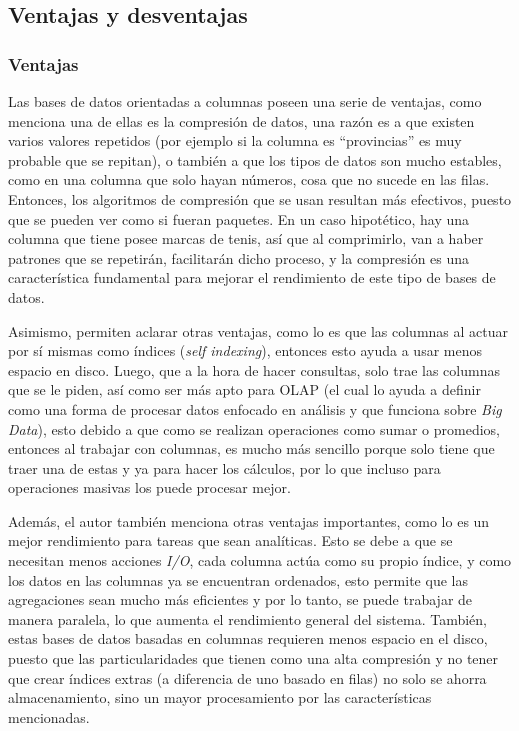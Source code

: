 \subsection{Ventajas y desventajas}
 \subsubsection{Ventajas}
 Las bases de datos orientadas a columnas poseen una serie de ventajas, como menciona \textcite{abadi2013} una de ellas es la compresión de datos, una razón es a que existen varios valores repetidos (por ejemplo si la columna es “provincias” es muy probable que se repitan), o también a que los tipos de datos son mucho estables, como en una columna que solo hayan números, cosa que no sucede en las filas. Entonces, los algoritmos de compresión que se usan resultan más efectivos, puesto que se pueden ver como si fueran paquetes. En un caso hipotético, hay una columna que tiene posee marcas de tenis, así que al comprimirlo, van a haber patrones que se repetirán, facilitarán dicho proceso, y la compresión es una característica fundamental para mejorar el rendimiento de este tipo de bases de datos.

 Asimismo, \textcite{saeed2020} permiten aclarar otras ventajas, como lo es que las columnas al actuar por sí mismas como índices (\textit{self indexing}), entonces esto ayuda a usar menos espacio en disco. Luego, que a la hora de hacer consultas, solo trae las columnas que se le piden, así como ser más apto para OLAP (el cual \textcite{pathania2022} lo ayuda a definir como una forma de procesar datos enfocado en análisis y que funciona sobre \textit{Big Data}), esto debido a que como se realizan operaciones como sumar o promedios, entonces al trabajar con columnas, es mucho más sencillo porque solo tiene que traer una de estas y ya para hacer los cálculos, por lo que incluso para operaciones masivas los puede procesar mejor.

 Además, el autor \textcite{matei2010} también menciona otras ventajas importantes, como lo es un mejor rendimiento para tareas que sean analíticas. Esto se debe a que se necesitan menos acciones \textit{I/O}, cada columna actúa como su propio índice, y como los datos en las columnas ya se encuentran ordenados, esto permite que las agregaciones sean mucho más eficientes y por lo tanto, se puede trabajar de manera paralela, lo que aumenta el rendimiento general del sistema. También, estas bases de datos basadas en columnas requieren menos espacio en el disco, puesto que las particularidades que tienen como una alta compresión y no tener que crear índices extras (a diferencia de uno basado en filas) no solo se ahorra almacenamiento, sino un mayor procesamiento por las características mencionadas.

